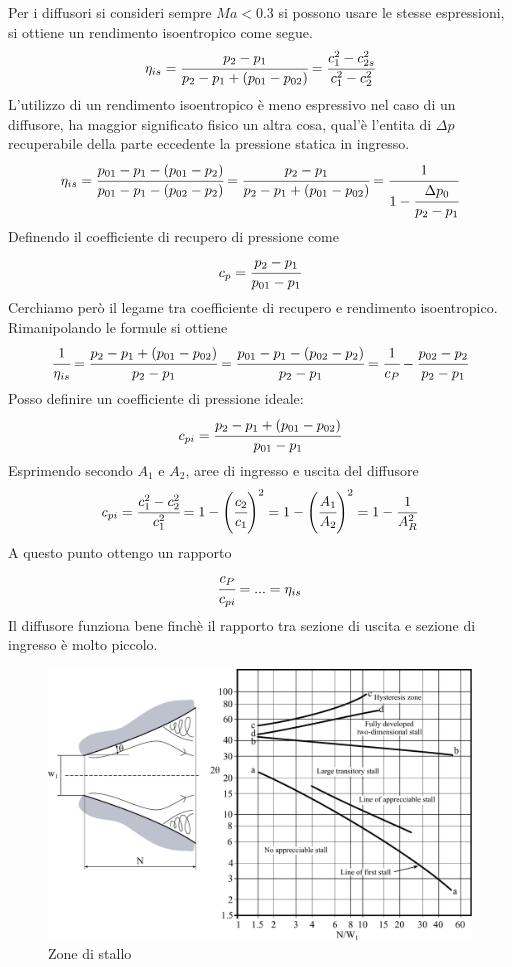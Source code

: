 Per i diffusori si consideri sempre $Ma<0.3$ si possono usare le stesse espressioni, si ottiene un rendimento isoentropico come segue.
\begin{align*}
\eta_{is} = \cfrac{p_2 - p_1}{p_2-p_1 + (p_{01}-p_{02})} = \cfrac{c_1^2 - c_{2s}^2}{c_1^2 - c_2^2}
\end{align*}
L'utilizzo di un rendimento isoentropico è meno espressivo nel caso di un diffusore, ha maggior significato fisico un altra cosa, qual'è l'entita di $ \Delta p$ recuperabile della parte eccedente la pressione statica in ingresso.
\begin{align*}
\eta_{is} = \cfrac{p_{01} - p_1 - (p_{01} - p_2)}{p_{01} - p_1-(p_{02} - p_2)} = \cfrac{p_2 - p_1}{p_2 - p_1 + (p_{01} - p_{02})} = \cfrac{1}{1- \cfrac{\Delta p_0}{p_2 - p_1}}
\end{align*}
Definendo il coefficiente di recupero di pressione come
\begin{align*}
c_p = \cfrac{p_2 - p_1}{p_{01} - p_1}
\end{align*}
Cerchiamo però il legame tra coefficiente di recupero e rendimento isoentropico. Rimanipolando le formule si ottiene
\begin{align*}
\cfrac{1}{\eta_{is}} = \cfrac{p_2 - p_1 + (p_{01} - p_{02})}{p_2 - p_1} = \cfrac{p_{01} - p_1 - (p_{02} - p_2)}{p_2-p_1} = \cfrac{1}{c_P} - \cfrac{p_{02} - p_2}{p_2 - p_1}
\end{align*}
Posso definire un coefficiente di pressione ideale:
\begin{align*}
c_{pi} = \cfrac{p_2 - p_1 + (p_{01} - p_{02})}{p_{01} - p_1}
\end{align*}
Esprimendo secondo $A_1$ e $A_2$, aree di ingresso e uscita del diffusore 
\begin{align*}
c_{pi} = \cfrac{c_1^2 - c_2^2}{c_1^2} = 1 - \left( \cfrac{c_2}{c_1}\right)^2 = 1- \left(\cfrac{A_1}{A_2} \right)^2 =1-\cfrac{1}{A_R^2}
\end{align*}
A questo punto ottengo un rapporto
\begin{align*}
\cfrac{c_P}{c_{pi}} = ... = \eta_{is}
\end{align*}
Il diffusore funziona bene finchè il rapporto tra sezione di uscita e sezione di ingresso è molto piccolo. 
\begin{figure}
\centering
  \includegraphics[width=.7\textwidth]{fig/stallo.pdf}
\caption{Zone di stallo}
\label{fig:stallo}
\end{figure}
